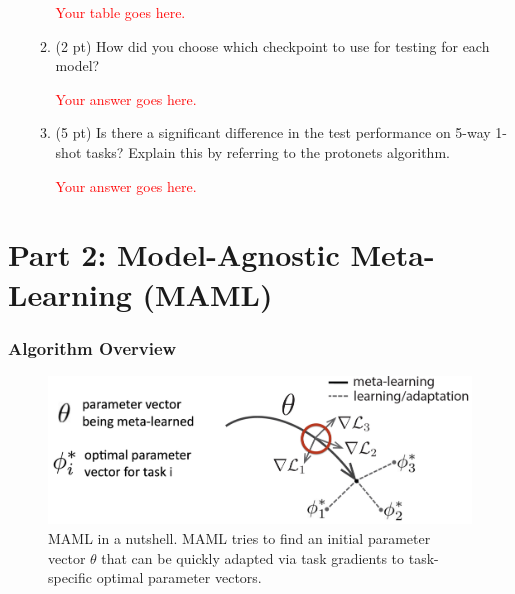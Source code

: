 \documentclass[12pt]{article}
\begin{document}
\begin{enumerate}
\begin{enumerate}
        \textcolor{red}{Your table goes here.}
        
        \item (2 pt) How did you choose which checkpoint to use for testing for each model? 
        
        \textcolor{red}{Your answer goes here.}
        
        \item (5 pt) Is there a significant difference in the test performance on 5-way 1-shot tasks? Explain this by referring to the protonets algorithm.
        
        \textcolor{red}{Your answer goes here.}

    \end{enumerate}
    
    

\end{enumerate}



\newpage
\section*{Part 2: Model-Agnostic Meta-Learning (MAML)~\cite{maml}}

\subsubsection*{Algorithm Overview}

\begin{figure}[H]
\centering
\includegraphics[width=0.8\linewidth]{figures/MAML.png}
\vspace{-3mm}
\caption{MAML in a nutshell. MAML tries to find an initial parameter vector $\theta$ that can be quickly adapted via task gradients to task-specific optimal parameter vectors.}
\label{fig:maml}
\end{figure}
\end{document}
